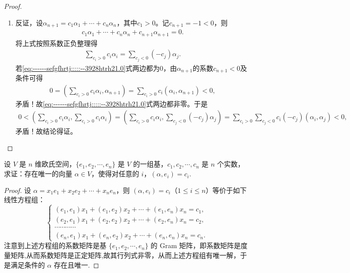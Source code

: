 \documentclass[../../main.tex]{subfiles}%
\begin{document}
\begin{proof}
\begin{enumerate}[(1)]
\item 反证，设$\alpha_{n+1}=c_1\alpha_1+\cdots+c_n\alpha_n$，其中$c_1>0$。记$c_{n+1}=-1<0$，则
\begin{align*}
c_1\alpha_1+\cdots+c_n\alpha_n+c_{n+1}\alpha_{n+1}=0.
\end{align*}
将上式按照系数正负整理得
\begin{align}
\sum\limits_{c_i>0}c_i\alpha_i=\sum\limits_{c_j<0}(-c_j)\alpha_j.\label{eq:------sefgfhrtj:::::--3928htrh21.0}
\end{align}
若\eqref{eq:------sefgfhrtj:::::--3928htrh21.0}式两边都为0，由$\alpha_{n+1}$的系数$c_{n+1}<0$及条件可得
\begin{align*}
0=\left(\sum\limits_{c_i>0}c_i\alpha_i,\alpha_{n+1}\right)=\sum\limits_{c_i>0}c_i\left(\alpha_i,\alpha_{n+1}\right)<0,
\end{align*}
矛盾！故\eqref{eq:------sefgfhrtj:::::--3928htrh21.0}式两边都非零。于是
\begin{align*}
0<\left(\sum\limits_{c_i>0}c_i\alpha_i,\sum\limits_{c_i>0}c_i\alpha_i\right)=\left(\sum\limits_{c_i>0}c_i\alpha_i,\sum\limits_{c_j<0}(-c_j)\alpha_j\right)=\sum\limits_{c_i>0}\sum\limits_{c_j<0}c_i(-c_j)\left(\alpha_i,\alpha_j\right)<0,
\end{align*}
矛盾！故结论得证。
\end{enumerate}
\end{proof}

\begin{proposition}\label{proposition:例9.7}
设 $V$ 是 $n$ 维欧氏空间，$\{e_1,e_2,\cdots,e_n\}$ 是 $V$ 的一组基，$c_1,c_2,\cdots,c_n$ 是 $n$ 个实数，求证：存在唯一的向量 $\alpha\in V$，使得对任意的 $i$，$(\alpha,e_i)=c_i$.
\end{proposition}
\begin{proof}
设 $\alpha = x_1e_1 + x_2e_2 + \cdots + x_ne_n$，则 $(\alpha,e_i)=c_i$（$1\leqslant  i\leqslant  n$）等价于如下线性方程组：
\[
\begin{cases}
(e_1,e_1)x_1 + (e_1,e_2)x_2 + \cdots + (e_1,e_n)x_n = c_1,\\
(e_2,e_1)x_1 + (e_2,e_2)x_2 + \cdots + (e_2,e_n)x_n = c_2,\\
\cdots\cdots\cdots\cdots\\
(e_n,e_1)x_1 + (e_n,e_2)x_2 + \cdots + (e_n,e_n)x_n = c_n.
\end{cases}
\]
注意到上述方程组的系数矩阵是基 $\{e_1,e_2,\cdots,e_n\}$ 的 Gram 矩阵，即系数矩阵是度量矩阵,从而系数矩阵是正定矩阵,故其行列式非零，从而上述方程组有唯一解，于是满足条件的 $\alpha$ 存在且唯一.
\end{proof}
\end{document}
